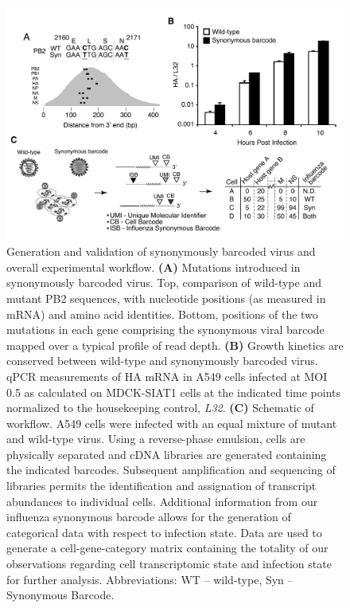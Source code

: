 \documentclass[9pt,lineno]{elife}
\begin{document}
\begin{figure}
\includegraphics[width=0.8\linewidth]{figures/Workflow/workflow.pdf}
\caption{\label{fig:workflow} Generation and validation of synonymously barcoded virus and overall experimental workflow.
{\bf (A)}  Mutations introduced in synonymously barcoded virus. Top, comparison of wild-type and mutant PB2 sequences, with nucleotide positions (as measured in mRNA) and amino acid identities. Bottom, positions of the two mutations in each gene comprising the synonymous viral barcode mapped over a typical profile of read depth.
{\bf (B)} Growth kinetics are conserved between wild-type and synonymously barcoded virus. qPCR measurements of HA mRNA in A549 cells infected at MOI 0.5 as calculated on MDCK-SIAT1 cells at the indicated time points normalized to the housekeeping control, \emph{L32}.
{\bf (C)}  Schematic of workflow. A549 cells were infected with an equal mixture of mutant and wild-type virus. Using a reverse-phase emulsion, cells are physically separated and cDNA libraries are generated containing the indicated barcodes. Subsequent amplification and sequencing of libraries permits the identification and assignation of transcript abundances to individual cells. Additional information from our influenza synonymous barcode allows for the generation of categorical data with respect to infection state. Data are used to generate a cell-gene-category matrix containing the totality of our observations regarding cell transcriptomic state and infection state for further analysis. Abbreviations: WT -- wild-type, Syn -- Synonymous Barcode.
}
\end{figure}
\end{document}
